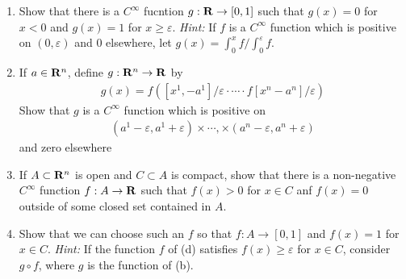 \begin{problems}
{\begin{enumerate}[label={\upshape(\alph*)}]
                    on $(-1, 1)$ and 0 else 0 elsewhere.
                \item Show that there is a $C^\infty$ fucntion $g:\mathbf{R}\to [0, 1]$ such that $g(x) = 0$ for $x<0$ and 
                    $g(x) = 1$ for $x\ge \varepsilon$. \textit{Hint:} If $f$ is a $C^\infty$ function which is positive
                    on $(0, \varepsilon)$ and 0 elsewhere, let $g(x) = \int_{0}^{x }{{f}\big/{\int_{0 }^{\varepsilon }{f }}}$.
                \item If $a\in \mathbf{R}^n$, define $g:\mathbf{R}^n\to \mathbf{R}$ by 
                    \begin{align*}
                        g(x) = f\left(\left[x^1,-a^1\right]/\varepsilon\cdot \cdots \cdot f\left[x^n - a^n\right]/\varepsilon\right)
                    \end{align*} 
                    Show that $g$ is a $C^\infty$ function which is positive on 
                    \begin{align*}
                        \left(a^1-\varepsilon, a^1+\varepsilon\right) \times \cdots, \times\left(a^n-\varepsilon, a^n+\varepsilon\right)
                    \end{align*}
                    and zero elsewhere
                \item If $A\subset \mathbf{R}^n$ is open and $C\subset A$ is compact, show that there is a 
                    non-negative $C^\infty$ function $f:A\to \mathbf{R}$ such that $f(x)>0$ for $x\in C$ anf $f(x) = 0$
                    outside of some closed set contained in $A$.
                \item Show that we can choose such an $f$ so that $f:A\to [0, 1]$ and $f(x) = 1$ for $x\in C$. 
                    \textit{Hint:} If the function $f$ of (d) satisfies $f(x)\ge \varepsilon$ for $x\in C$, consider 
                    $g\circ f$, where $g$ is the function of (b).
            \end{enumerate}
        }
\end{problems}